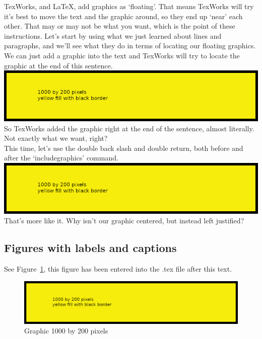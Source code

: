 TexWorks, and LaTeX, add graphics as `floating'.  That means TexWorks will try it's best to move the text and the graphic around, so they end up `near' each other. That may or may not be what you want, which is the point of these instructions. Let's start by using what we just learned about lines and paragraphs, and we'll see what they do in terms of locating our floating graphics.  We can just add a graphic into the text and TexWorks will try to locate the graphic at the end of this sentence. \includegraphics{1000x200} So TexWorks added the graphic right at the end of the sentence, almost literally.  Not exactly what we want, right?\\

This time, let's use the double back slash and double return, both before and after the `includegraphics' command.\\

\includegraphics{1000x200}\\ %

That's more like it.  Why isn't our graphic centered, but instead left justified?

\subsection*{Figures with labels and captions}

See Figure~\ref{fg:1000x200}, this figure has been entered into the .tex file after this text.  

\begin{figure}[H]
\centering
\includegraphics{1000x200}
\caption{Graphic 1000 by 200 pixels}\label{fg:1000x200}
\end{figure}

